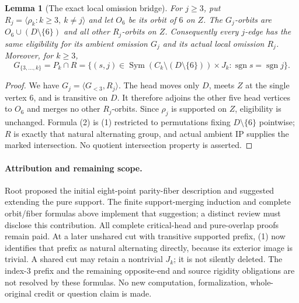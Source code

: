 \documentclass[11pt,a4paper]{article}
\newtheorem{lemma}{Lemma}
\newcommand{\gen}[1]{\langle#1\rangle}
\newcommand{\Sym}{\operatorname{Sym}}
\begin{document}
\begin{lemma}[The exact local omission bridge]\label{orbit}
For $j\ge3$, put $R_j=\gen{\rho_k:k\ge3,\ k\ne j}$ and
let $O_6$ be its orbit of $6$ on $Z$. The $G_j$-orbits are
$O_6\cup(D\setminus\{6\})$ and all other $R_j$-orbits on $Z$.
Consequently every $j$-edge has the same eligibility for its
ambient omission $G_j$ and its actual local omission $R_j$.
Moreover, for $k\ge3$,
\[
 G_{\{3,\ldots,k\}}=P_k\cap R
 =\{(s,j)\in\Sym(C_k\setminus(D\setminus\{6\}))\times J_k:
                                \operatorname{sgn}s=\operatorname{sgn}j\}.
                                                        \tag{2}
\]
\end{lemma}
\begin{proof}
We have $G_j=\gen{G_{<3},R_j}$. The head moves only $D$, meets
$Z$ at the single vertex $6$, and is transitive on $D$. It therefore
adjoins the other five head vertices to $O_6$ and merges no other
$R_j$-orbits. Since $\rho_j$ is supported on $Z$, eligibility is
unchanged. Formula (2) is (1) restricted to permutations fixing
$D\setminus\{6\}$ pointwise; $R$ is exactly that natural alternating
group, and actual ambient IP supplies the marked intersection.
No quotient intersection property is asserted.
\end{proof}

\paragraph{Attribution and remaining scope.}
Root proposed the initial eight-point parity-fiber description and
suggested extending the pure support. The finite support-merging
induction and complete orbit/fiber formulas above implement that
suggestion; a distinct review must disclose this contribution.
All complete critical-head and pure-overlap proofs remain paid.
At a later unshared cut with transitive supported prefix, (1) now
identifies that prefix as natural alternating directly, because its
exterior image is trivial. A shared cut may retain a nontrivial
$J_k$; it is not silently deleted. The index-$3$ prefix and the
remaining opposite-end and source rigidity obligations are not
resolved by these formulas. No new computation, formalization,
whole-original credit or question claim is made.
\end{document}
